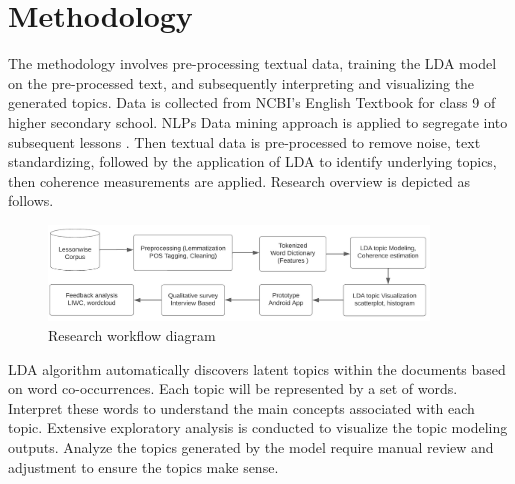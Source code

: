 \documentclass[sn-mathphys,Numbered]{sn-jnl}%
\theoremstyle{thmstyleone}%
\theoremstyle{thmstyletwo}%
\theoremstyle{thmstylethree}%
\begin{document}
\section{Methodology}\label{methods}
The methodology involves pre-processing textual data, training the LDA model on the pre-processed text, and subsequently interpreting and visualizing the generated topics. Data is collected from NCBI's English Textbook for class 9 of higher secondary school. NLPs Data mining approach is applied to segregate into subsequent lessons \cite{kao_natural_2007, mccarthy_applied_2012}. Then textual data is pre-processed to remove noise, text standardizing, followed by the application of LDA to identify underlying topics, then coherence measurements are applied. Research overview is depicted as follows. 

\begin{figure}[h!]
\centering
\includegraphics[width=0.9\textwidth]{methodology.png}
\caption{Research workflow diagram}
\end{figure}

LDA algorithm automatically discovers latent topics within the documents based on word co-occurrences. Each topic will be represented by a set of words. Interpret these words to understand the main concepts associated with each topic. Extensive exploratory analysis is conducted to visualize the topic modeling outputs. Analyze the topics generated by the model require manual review and adjustment to ensure the topics make sense.
\end{document}
